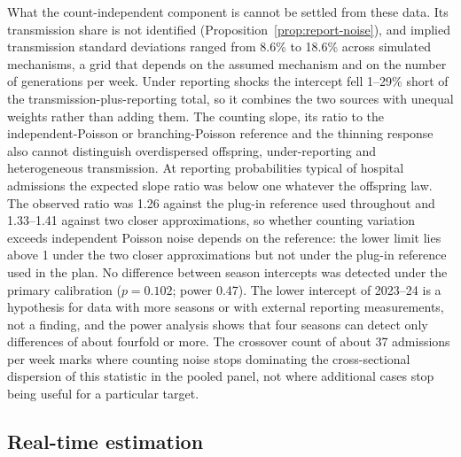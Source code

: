 What the count-independent component is cannot be settled from these data. Its transmission share is not identified (Proposition~\ref{prop:report-noise}), and implied transmission standard deviations ranged from 8.6\% to 18.6\% across simulated mechanisms, a grid that depends on the assumed mechanism and on the number of generations per week. Under reporting shocks the intercept fell 1--29\% short of the transmission-plus-reporting total, so it combines the two sources with unequal weights rather than adding them. The counting slope, its ratio to the independent-Poisson or branching-Poisson reference and the thinning response also cannot distinguish overdispersed offspring, under-reporting and heterogeneous transmission. At reporting probabilities typical of hospital admissions the expected slope ratio was below one whatever the offspring law. The observed ratio was 1.26 against the plug-in reference used throughout and 1.33--1.41 against two closer approximations, so whether counting variation exceeds independent Poisson noise depends on the reference: the lower limit lies above 1 under the two closer approximations but not under the plug-in reference used in the plan. No difference between season intercepts was detected under the primary calibration ($p=0.102$; power 0.47). The lower intercept of 2023--24 is a hypothesis for data with more seasons or with external reporting measurements, not a finding, and the power analysis shows that four seasons can detect only differences of about fourfold or more. The crossover count of about 37 admissions per week marks where counting noise stops dominating the cross-sectional dispersion of this statistic in the pooled panel, not where additional cases stop being useful for a particular target.

\subsection{Real-time estimation}
\label{sec:disc-realtime}

